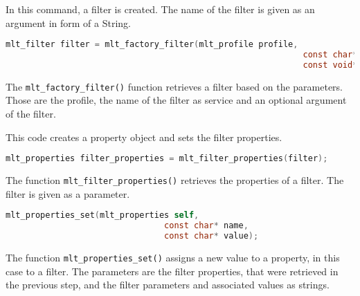 \documentclass[../MasterThesis.tex]{subfiles}
\begin{document}
\begin{description}[font=\normalfont\color{RedViolet!80!black}, style=nextline]
	
	
	\item[Create a filter] 
	
	In this command, a filter is created. The name of the filter is given as an argument in form of a String.
	
	\begin{lstlisting}[language=C, numbers=none, basicstyle=\footnotesize\ttfamily, belowskip=0pt, aboveskip=9pt]
	mlt_filter filter = mlt_factory_filter(mlt_profile profile, 
															const char* service, 
															const void* input); \end{lstlisting}
														
	The \texttt{mlt\_factory\_filter()} function retrieves a filter based on the parameters. Those are the profile, the name of the filter as service and an optional argument of the filter.



	\item[Create and set filter properties] 

	This code creates a property object and sets the filter properties.

	\begin{lstlisting}[language=C, numbers=none, basicstyle=\footnotesize\ttfamily, belowskip=0pt, aboveskip=9pt]
	mlt_properties filter_properties = mlt_filter_properties(filter); \end{lstlisting}

	The function \texttt{mlt\_filter\_properties()} retrieves the properties of a filter. The filter is given as a parameter.

	\begin{lstlisting}[language=C, numbers=none, basicstyle=\footnotesize\ttfamily, belowskip=0pt, aboveskip=9pt]
	mlt_properties_set(mlt_properties self,
								const char* name,
								const char* value); \end{lstlisting}

	The function \texttt{mlt\_properties\_set()} assigns a new value to a property, in this case to a filter. The parameters are the filter properties, that were retrieved in the previous step, and the filter parameters and associated values as strings.
	
	
	
	
	\item[Connect elements] 
	

\end{description}
\end{document}
